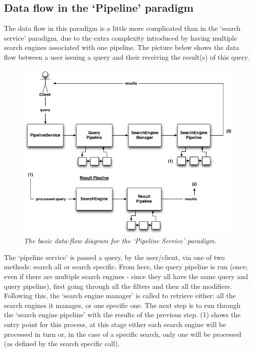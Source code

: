 \documentclass[letterpaper,10pt,english]{sphinxmanual}
\begin{document}
\subsection{Data flow in the `Pipeline' paradigm}
\label{pipeline:data-flow-in-the-pipeline-paradigm}
The data flow in this paradigm is a little more complicated than in the ‘search service’ paradigm, due to the extra complexity introduced by having multiple search engines associated with one pipeline. The picture below shows the data flow between a user issuing a query and their receiving the result(s) of this query.
\begin{figure}[htbp]
\centering
\capstart

\includegraphics{puppy-pipeline-data-flow.png}
\caption{\emph{The basic data-flow diagram for the `Pipeline Service' paradigm.}}\end{figure}

The `pipeline service' is passed a query, by the user/client, via one of two methods: search all or search specific. From here, the query pipeline is run (once; even if there are multiple search engines - since they all have the same query and query pipeline), first going through all the filters and then all the modifiers. Following this, the `search engine manager' is called to retrieve either: all the search engines it manages, or one specific one. The next step is to run through the `search engine pipeline' with the results of the previous step. (1) shows the entry point for this process, at this stage either each search engine will be processed in turn or, in the case of a specific search, only one will be processed (as defined by the search specific call).
\end{document}

